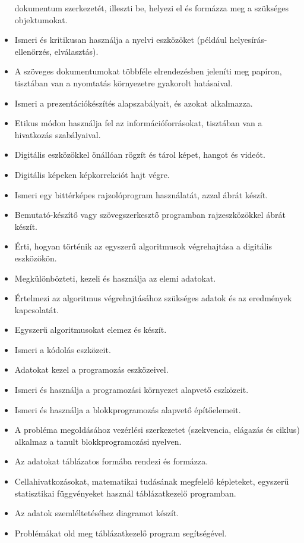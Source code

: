 \begin{itemize}
  dokumentum szerkezetét, illeszti be, helyezi el és formázza meg a
  szükséges objektumokat.
\item
  Ismeri és kritikusan használja a nyelvi eszközöket (például
  helyesírás-ellenőrzés, elválasztás).
\item
  A szöveges dokumentumokat többféle elrendezésben jeleníti meg papíron,
  tisztában van a nyomtatás környezetre gyakorolt hatásaival.
\item
  Ismeri a prezentációkészítés alapszabályait, és azokat alkalmazza.
\item
  Etikus módon használja fel az információforrásokat, tisztában van a
  hivatkozás szabályaival.
\item
  Digitális eszközökkel önállóan rögzít és tárol képet, hangot és
  videót.
\item
  Digitális képeken képkorrekciót hajt végre.
\item
  Ismeri egy bittérképes rajzolóprogram használatát, azzal ábrát készít.
\item
  Bemutató-készítő vagy szövegszerkesztő programban rajzeszközökkel
  ábrát készít.
\item
  Érti, hogyan történik az egyszerű algoritmusok végrehajtása a
  digitális eszközökön.
\item
  Megkülönbözteti, kezeli és használja az elemi adatokat.
\item
  Értelmezi az algoritmus végrehajtásához szükséges adatok és az
  eredmények kapcsolatát.
\item
  Egyszerű algoritmusokat elemez és készít.
\item
  Ismeri a kódolás eszközeit.
\item
  Adatokat kezel a programozás eszközeivel.
\item
  Ismeri és használja a programozási környezet alapvető eszközeit.
\item
  Ismeri és használja a blokkprogramozás alapvető építőelemeit.
\item
  A probléma megoldásához vezérlési szerkezetet (szekvencia, elágazás és
  ciklus) alkalmaz a tanult blokkprogramozási nyelven.
\item
  Az adatokat táblázatos formába rendezi és formázza.
\item
  Cellahivatkozásokat, matematikai tudásának megfelelő képleteket,
  egyszerű statisztikai függvényeket használ táblázatkezelő programban.
\item
  Az adatok szemléltetéséhez diagramot készít.
\item
  Problémákat old meg táblázatkezelő program segítségével.

\end{itemize}
